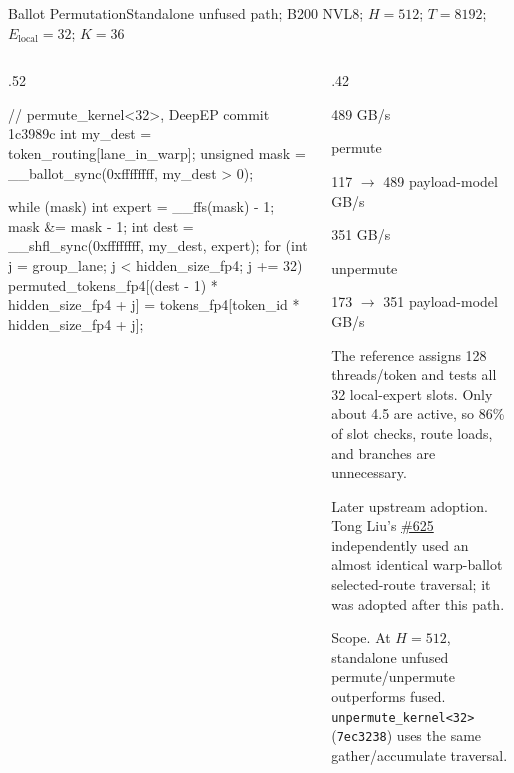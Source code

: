\documentclass[aspectratio=169,10pt]{beamer}
\renewcommand{\NvidiaSource}[1]{}
\newcommand{\LocalSource}[1]{\NvidiaSource{\texttt{#1}}}
\newcommand{\NvidiaMiniMetric}[3]{%
  \begin{minipage}[t]{.47\linewidth}\raggedright
    {\NvidiaSansMedium\fontsize{13}{15.5}\selectfont\color{NvidiaBlack}#1}\par
    {\fontsize{8}{10}\selectfont\color{NvidiaCharcoal}#2}\par
    {\fontsize{7.5}{9}\selectfont\color{NvidiaGray}#3}
  \end{minipage}%
}
\begin{document}
\begin{frame}[fragile]{Ballot Permutation}{Standalone unfused path; B200 NVL8; $H=512$; $T=8192$; $E_{\mathrm{local}}=32$; $K=36$}
  \LocalSource{notes/hybrid-ep-sparse-opt-new.md; DeepEP commits 1c3989c, 7ec3238}
  \begin{columns}[T,onlytextwidth]
    \begin{column}{.52\textwidth}
      \begin{NvidiaCode}[language=NvidiaCUDA,basicstyle=\ttfamily\fontsize{6}{7.1}\selectfont]
// permute_kernel<32>, DeepEP commit 1c3989c
int my_dest = token_routing[lane_in_warp];
unsigned mask = __ballot_sync(0xffffffff, my_dest > 0);

while (mask) {
  int expert = __ffs(mask) - 1;
  mask &= mask - 1;
  int dest = __shfl_sync(0xffffffff, my_dest, expert);
  for (int j = group_lane; j < hidden_size_fp4; j += 32)
    permuted_tokens_fp4[(dest - 1) * hidden_size_fp4 + j] =
        tokens_fp4[token_id * hidden_size_fp4 + j];
}
      \end{NvidiaCode}
    \end{column}
    \begin{column}{.42\textwidth}
      \noindent\NvidiaMiniMetric{489 GB/s}{permute}{117 $\rightarrow$ 489 payload-model GB/s}\hfill
      \NvidiaMiniMetric{351 GB/s}{unpermute}{173 $\rightarrow$ 351 payload-model GB/s}
      \par\vspace{.025in}\par\vspace{.02in}
      {\fontsize{8}{9.3}\selectfont\setlength{\parskip}{0pt}\noindent
      The reference assigns 128 threads/token and tests all 32 local-expert slots. Only about
      4.5 are active, so 86\% of slot checks, route loads, and branches are unnecessary.\par}
      \vspace{.015in}
      {\fontsize{7.5}{8.8}\selectfont\setlength{\parskip}{0pt}\noindent
      \textcolor{NvidiaGreen}{\NvidiaSansMedium Later upstream adoption.} Tong Liu's
      \href{https://github.com/deepseek-ai/DeepEP/pull/625}{\#625} independently used an almost
      identical warp-ballot selected-route traversal; it was adopted after this path.\par}
      \vspace{.01in}
      {\fontsize{7.5}{8.8}\selectfont\setlength{\parskip}{0pt}\noindent
      \textcolor{NvidiaGreen}{\NvidiaSansMedium Scope.} At $H=512$, standalone unfused
      permute/unpermute outperforms fused. \texttt{unpermute\_kernel<32>} (\texttt{7ec3238})
      uses the same gather/accumulate traversal.\par}
    \end{column}
  \end{columns}
\end{frame}
\end{document}
